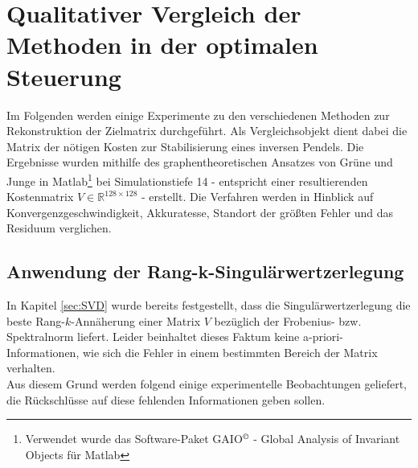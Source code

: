 \documentclass[12pt,a4paper,twoside]{article}
\begin{document}
\section{Qualitativer Vergleich der Methoden in der optimalen Steuerung}
Im Folgenden werden einige Experimente zu den verschiedenen Methoden zur Rekonstruktion der Zielmatrix durchgeführt. Als Vergleichsobjekt dient dabei die Matrix der nötigen Kosten zur Stabilisierung eines inversen Pendels. Die Ergebnisse wurden mithilfe des graphentheoretischen Ansatzes von Grüne und Junge \citep{Grune2005} in Matlab\footnote{Verwendet wurde das Software-Paket GAIO$^\copyright$	 - Global Analysis of Invariant Objects für Matlab} bei Simulationstiefe 14 - entspricht einer resultierenden Kostenmatrix $V\in\mathds{R}^{128\times 128}$ - erstellt. Die Verfahren werden in Hinblick auf Konvergenzgeschwindigkeit, Akkuratesse, Standort der größten Fehler und das Residuum verglichen.
\subsection{Anwendung der Rang-k-Singulärwertzerlegung}
In Kapitel \ref{sec:SVD} wurde bereits festgestellt, dass die Singulärwertzerlegung die beste Rang-$k$-Annäherung einer Matrix $V$ bezüglich der Frobenius- bzw. Spektralnorm liefert. Leider beinhaltet dieses Faktum keine a-priori-Informationen, wie sich die Fehler in einem bestimmten Bereich der Matrix verhalten. \\
Aus diesem Grund werden folgend einige experimentelle Beobachtungen geliefert, die Rückschlüsse auf diese fehlenden Informationen geben sollen. 
\end{document}
